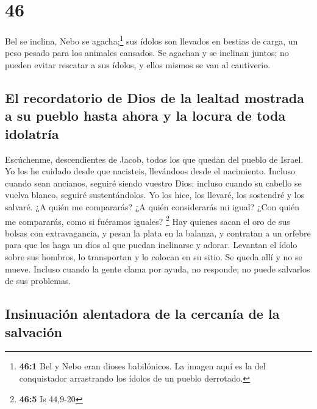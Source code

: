 \hypertarget{section-45}{%
\section{46}\label{section-45}}

 Bel se inclina, Nebo se agacha;\footnote{\textbf{46:1}
  Bel y Nebo eran dioses babilónicos. La imagen aquí es la del
  conquistador arrastrando los ídolos de un pueblo derrotado.} sus
ídolos son llevados en bestias de carga, un peso pesado para los
animales cansados.  Se agachan y se inclinan juntos; no
pueden evitar rescatar a sus ídolos, y ellos mismos se van al
cautiverio.

\hypertarget{el-recordatorio-de-dios-de-la-lealtad-mostrada-a-su-pueblo-hasta-ahora-y-la-locura-de-toda-idolatruxeda}{%
\subsection{El recordatorio de Dios de la lealtad mostrada a su pueblo
hasta ahora y la locura de toda
idolatría}\label{el-recordatorio-de-dios-de-la-lealtad-mostrada-a-su-pueblo-hasta-ahora-y-la-locura-de-toda-idolatruxeda}}

 Escúchenme, descendientes de Jacob, todos los que quedan
del pueblo de Israel. Yo los he cuidado desde que nacisteis, llevándoos
desde el nacimiento.  Incluso cuando sean ancianos,
seguiré siendo vuestro Dios; incluso cuando su cabello se vuelva blanco,
seguiré sustentándolos. Yo los hice, los llevaré, los sostendré y los
salvaré.  ¿A quién me compararás? ¿A quién considerarás mi
igual? ¿Con quién me compararás, como si fuéramos iguales? \footnote{\textbf{46:5}
  Is 44,9-20}  Hay quienes sacan el oro de sus bolsas con
extravagancia, y pesan la plata en la balanza, y contratan a un orfebre
para que les haga un dios al que puedan inclinarse y adorar.
 Levantan el ídolo sobre sus hombros, lo transportan y lo
colocan en su sitio. Se queda allí y no se mueve. Incluso cuando la
gente clama por ayuda, no responde; no puede salvarlos de sus problemas.

\hypertarget{insinuaciuxf3n-alentadora-de-la-cercanuxeda-de-la-salvaciuxf3n}{%
\subsection{Insinuación alentadora de la cercanía de la
salvación}\label{insinuaciuxf3n-alentadora-de-la-cercanuxeda-de-la-salvaciuxf3n}}

